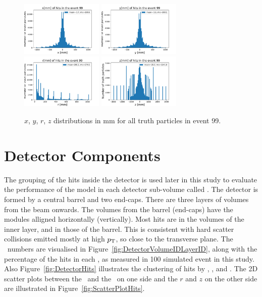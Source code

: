 \begin{figure}[htb]
\centering
\includegraphics[width=0.35\textwidth]{plots/DataExploration_x.pdf}
\includegraphics[width=0.35\textwidth]{plots/DataExploration_y.pdf}\\
\includegraphics[width=0.35\textwidth]{plots/DataExploration_r.pdf}
\includegraphics[width=0.35\textwidth]{plots/DataExploration_z.pdf}
\caption{$x$, $y$, $r$, $z$ distributions in mm for all truth particles in event 99.}
\label{fig:ReconstructedHits}
\end{figure}

\section{Detector Components}

The grouping of the hits inside the detector is used later in this study to evaluate the performance of the model in each detector sub-volume called \volumeID. The detector is formed by a central barrel and two end-caps. There are three layers of volumes from the beam onwards. The volumes from the barrel (end-caps) have the modules alligned horizontally (vertically). Most hits are in the volumes of the inner layer, and in those of the barrel. This is consistent with hard scatter collisions emitted mostly at high $p_{\mathrm{T}}$, so close to the transverse plane. The \volumeID~numbers are visualised in Figure~\ref{fig:DetectorVolumeIDLayerID}, along with the percentage of the hits in each \volumeID, as measured in 100 simulated event in this study. Also Figure~\ref{fig:DetectorHits} illustrates the clustering of hits by \volumeID, \layerID, and \moduleID. The 2D scatter plots between the \volumeID~and the \moduleID~on one side and the $r$ and $z$ on the other side are illustrated in Figure~\ref{fig:ScatterPlotHits}. 

